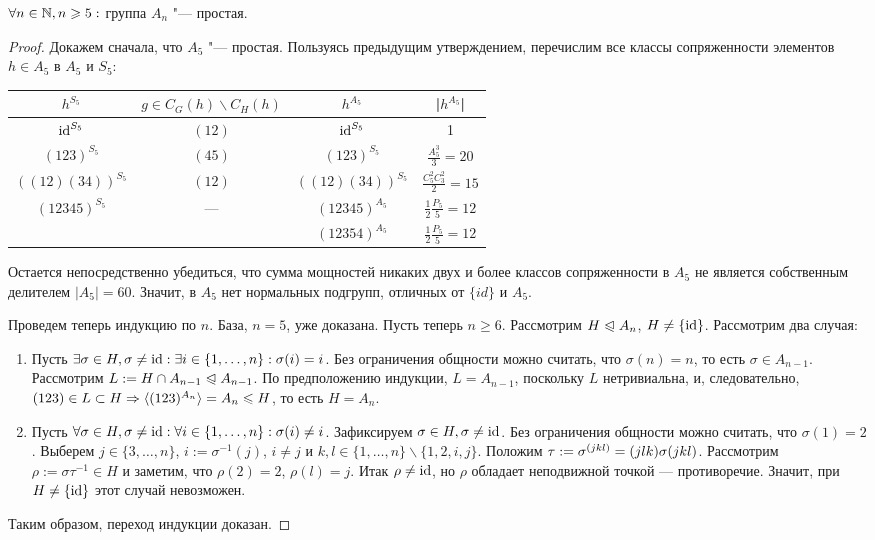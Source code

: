 \begin{theorem}
	$\forall n \in \mathbb{N}, n \geqslant 5:$ группа $A_n$ "--- простая.
\end{theorem}

\begin{proof}
	Докажем сначала, что $A_5$ "--- простая. Пользуясь предыдущим утверждением, перечислим все классы сопряженности элементов $h \in A_5$ в $A_5$ и $S_5$:
	
	\def\arraystretch{1.5}
	\begin{center}
		\begin{tabular}{c|c|c|c}
			$h^{S_5}$ & $g \in C_G(h) \backslash C_H(h)$ & $h^{A_5}$ & |$h^{A_5}$| \\
			\hline
			$\operatorname{id}^{S_5}$ & $(12)$ & $\operatorname{id}^{S_5}$ & 1\\
			\hline
			$(123)^{S_5}$ & $(45)$ & $(123)^{S_5}$ & $\frac{A_5^3}3 = 20$\\
			\hline
			$((12)(34))^{S_5}$ & $(12)$ & $((12)(34))^{S_5}$ & $\frac{C_5^2C_3^2}2 = 15$ \\
			\hline
			\multirow{2}{*}{$(12345)^{S_5}$}& \multirow{2}{*}{---} & $(12345)^{A_5}$ & $\frac12\frac{P_5}{5} = 12$ \\
			\cline{3-4}
			&  & $(12354)^{A_5}$ & $\frac12\frac{P_5}{5} = 12$ \\
		\end{tabular}
	\end{center}
	\def\arraystretch{1}
	
	Остается непосредственно убедиться, что сумма мощностей никаких двух и более классов сопряженности в $A_5$ не является собственным делителем $|A_5| = 60$. Значит, в $A_5$ нет нормальных подгрупп, отличных от $\{id\}$ и $A_5$.
	
	Проведем теперь индукцию по $n$. База, $n = 5$, уже доказана. Пусть теперь $n \ge 6$. Рассмотрим $H \trianglelefteqslant A_n$, $H \ne \{\operatorname{id}\}$. Рассмотрим два случая:
	\begin{enumerate}
		\item Пусть $\exists \sigma \in H, \sigma \ne \operatorname{id}: \exists i \in \{1, \dotsc, n\}: \sigma(i) = i$. Без ограничения общности можно считать, что $\sigma(n) = n$, то есть $\sigma \in A_{n-1}$. Рассмотрим $L := H \cap A_{n - 1} \trianglelefteqslant A_{n - 1}$. По предположению индукции, $L = A_{n - 1}$, поскольку $L$ нетривиальна, и, следовательно, $(123) \in L \subset H \hm\ra \gl(123)^{A_n}\gr = A_n \le H$, то есть $H = A_n$.
		\item Пусть $\forall \sigma \in H, \sigma \ne \operatorname{id}: \forall i \in \{1, \dotsc, n\}: \sigma(i) \ne i$. Зафиксируем $\sigma \in H, \sigma \ne \operatorname{id}$. Без ограничения общности можно считать, что $\sigma(1) = 2$. Выберем $j \in \{3, \dotsc, n\}$, $i := \sigma^{-1}(j)$, $i \ne j$ и $k, l \in \{1, \dotsc, n\} \backslash \{1, 2, i, j\}$. Положим $\tau := \sigma^{(jkl)} \hm= (jlk)\sigma(jkl)$. Рассмотрим $\rho := \sigma\tau^{-1} \in H$ и заметим, что $\rho(2) = 2$, $\rho(l) = j$. Итак $\rho \ne \operatorname{id}$, но $\rho$ обладает неподвижной точкой --- противоречие. Значит, при $H \ne \{\operatorname{id}\}$ этот случай невозможен.
	\end{enumerate}
	
	Таким образом, переход индукции доказан.
\end{proof}

